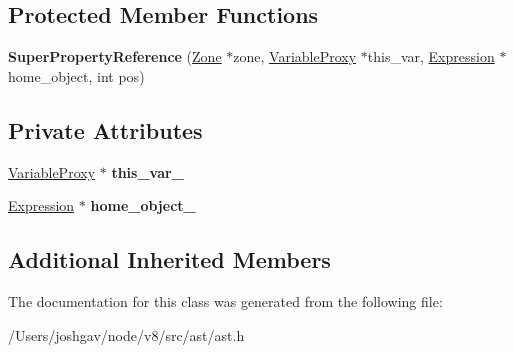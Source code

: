 \subsection*{Protected Member Functions}
\begin{DoxyCompactItemize}
\item 
{\bfseries Super\+Property\+Reference} (\hyperlink{classv8_1_1internal_1_1_zone}{Zone} $\ast$zone, \hyperlink{classv8_1_1internal_1_1_variable_proxy}{Variable\+Proxy} $\ast$this\+\_\+var, \hyperlink{classv8_1_1internal_1_1_expression}{Expression} $\ast$home\+\_\+object, int pos)\hypertarget{classv8_1_1internal_1_1_super_property_reference_a5804cb0353702fb6c0cdca12d723ac55}{}\label{classv8_1_1internal_1_1_super_property_reference_a5804cb0353702fb6c0cdca12d723ac55}

\end{DoxyCompactItemize}
\subsection*{Private Attributes}
\begin{DoxyCompactItemize}
\item 
\hyperlink{classv8_1_1internal_1_1_variable_proxy}{Variable\+Proxy} $\ast$ {\bfseries this\+\_\+var\+\_\+}\hypertarget{classv8_1_1internal_1_1_super_property_reference_a4cc02f65bbd44e3817ce788e6c639475}{}\label{classv8_1_1internal_1_1_super_property_reference_a4cc02f65bbd44e3817ce788e6c639475}

\item 
\hyperlink{classv8_1_1internal_1_1_expression}{Expression} $\ast$ {\bfseries home\+\_\+object\+\_\+}\hypertarget{classv8_1_1internal_1_1_super_property_reference_ac8bf5461969e7eac8352eeeb7c7c9a8f}{}\label{classv8_1_1internal_1_1_super_property_reference_ac8bf5461969e7eac8352eeeb7c7c9a8f}

\end{DoxyCompactItemize}
\subsection*{Additional Inherited Members}


The documentation for this class was generated from the following file\+:\begin{DoxyCompactItemize}
\item 
/\+Users/joshgav/node/v8/src/ast/ast.\+h\end{DoxyCompactItemize}
